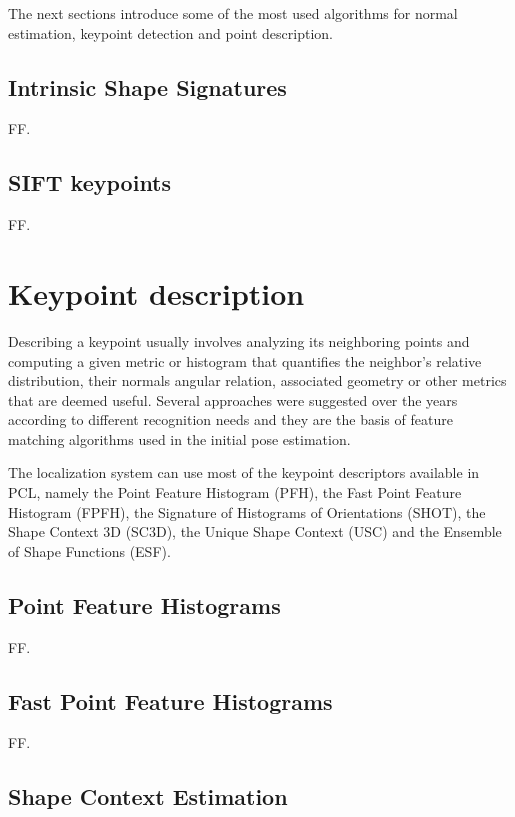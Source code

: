 The next sections introduce some of the most used algorithms for normal estimation, keypoint detection and point description.


\subsection{Intrinsic Shape Signatures}

FF.


\subsection{SIFT keypoints}

FF.



\section{Keypoint description}

Describing a keypoint usually involves analyzing its neighboring points and computing a given metric or histogram that quantifies the neighbor’s relative distribution, their normals angular relation, associated geometry or other metrics that are deemed useful. Several approaches were suggested over the years according to different recognition needs and they are the basis of feature matching algorithms used in the initial pose estimation.

The localization system can use most of the keypoint descriptors available in PCL, namely the Point Feature Histogram (PFH), the Fast Point Feature Histogram (FPFH), the Signature of Histograms of Orientations (SHOT), the Shape Context 3D (SC3D), the Unique Shape Context (USC) and the Ensemble of Shape Functions (ESF).


\subsection{Point Feature Histograms}

FF.


\subsection{Fast Point Feature Histograms}

FF.


\subsection{Shape Context Estimation}


